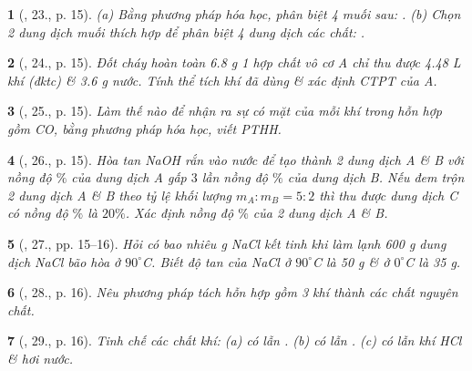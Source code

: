 \documentclass{article}
\newtheorem{baitoan}{}
\begin{document}
\begin{baitoan}[\cite{An_400_BT_Hoa_Hoc_9}, 23., p. 15]
	(a) Bằng phương pháp hóa học, phân biệt 4 muối sau: {\rm{}}. (b) Chọn 2 dung dịch muối thích hợp để phân biệt 4 dung dịch các chất: {\rm{}}.
\end{baitoan}

\begin{baitoan}[\cite{An_400_BT_Hoa_Hoc_9}, 24., p. 15]
	Đốt cháy hoàn toàn {\rm6.8 g} 1 hợp chất vô cơ A chỉ thu được {\rm4.48 L} khí {\rm{}} (đktc) \& {\rm3.6 g} nước. Tính thể tích khí {\rm{}} đã dùng \& xác định {\rm CTPT} của A.
\end{baitoan}

\begin{baitoan}[\cite{An_400_BT_Hoa_Hoc_9}, 25., p. 15]
	Làm thế nào để nhận ra sự có mặt của mỗi khí trong hỗn hợp gồm {\rm CO, } bằng phương pháp hóa học, viết {\rm PTHH}.
\end{baitoan}

\begin{baitoan}[\cite{An_400_BT_Hoa_Hoc_9}, 26., p. 15]
	Hòa tan {\rm NaOH} rắn vào nước để tạo thành 2 dung dịch A \& B với nồng độ $\%$ của dung dịch A gấp $3$ lần nồng độ $\%$ của dung dịch B. Nếu đem trộn 2 dung dịch A \& B theo tỷ lệ khối lượng $m_A:m_B = 5:2$ thì thu được dung dịch C có nồng độ $\%$ là $20\%$. Xác định nồng độ $\%$ của 2 dung dịch A \& B.
\end{baitoan}

\begin{baitoan}[\cite{An_400_BT_Hoa_Hoc_9}, 27., pp. 15--16]
	Hỏi có bao nhiêu {\rm g NaCl} kết tinh khi làm lạnh {\rm600 g} dung dịch {\rm NaCl} bão hòa ở $90^\circ${\rm C}. Biết độ tan của {\rm NaCl} ở $90^\circ${\rm C} là {\rm50 g} \& ở $0^\circ${\rm C} là {\rm35 g}.
\end{baitoan}

\begin{baitoan}[\cite{An_400_BT_Hoa_Hoc_9}, 28., p. 16]
	Nêu phương pháp tách hỗn hợp gồm 3 khí {\rm{}} thành các chất nguyên chất.
\end{baitoan}

\begin{baitoan}[\cite{An_400_BT_Hoa_Hoc_9}, 29., p. 16]
	Tinh chế các chất khí: (a) {\rm{}} có lẫn {\rm{}}. (b) {\rm{}} có lẫn {\rm{}}. (c) {\rm{}} có lẫn khí {\rm HCl} \& hơi nước.
\end{baitoan}
\end{document}
